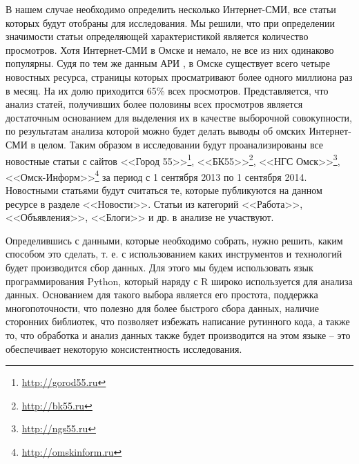 В нашем случае необходимо определить несколько Интернет-СМИ, все статьи которых будут отобраны для исследования. Мы решили, что при определении значимости статьи определяющей характеристикой является количество просмотров. Хотя Интернет-СМИ в Омске и немало, не все из них одинаково популярны. Судя по тем же данным АРИ \cite{ari_rating}, в Омске существует всего четыре новостных ресурса, страницы которых просматривают более одного миллиона раз в месяц. На их долю приходится 65\% всех просмотров. Представляется, что анализ статей, получивших более половины всех просмотров является достаточным основанием для выделения их в качестве выборочной совокупности, по результатам анализа которой можно будет делать выводы об омских Интернет-СМИ в целом. Таким образом в исследовании будут проанализированы все новостные статьи с сайтов <<Город 55>>\footnote{\href{http://gorod55.ru}{http://gorod55.ru}}, <<БК55>>\footnote{\href{http://bk55.ru}{http://bk55.ru}}, <<НГС Омск>>\footnote{\href{http://ngs55.ru}{http://ngs55.ru}}, <<Омск-Информ>>\footnote{\href{http://omskinform.ru}{http://omskinform.ru}} за период с 1 сентября 2013 по 1 сентября 2014. Новостными статьями будут считаться те, которые публикуются на данном ресурсе в разделе <<Новости>>. Статьи из категорий <<Работа>>, <<Объявления>>, <<Блоги>> и др. в анализе не участвуют.

Определившись с данными, которые необходимо собрать, нужно решить, каким способом это сделать, т. е. с использованием каких инструментов и технологий будет производится сбор данных. Для этого мы будем использовать язык программирования Python, который наряду с R широко используется для анализа данных. Основанием для такого выбора является его простота, поддержка многопоточности, что полезно для более быстрого сбора данных, наличие сторонних библиотек, что позволяет избежать написание рутинного кода, а также то, что обработка и анализ данных также будет производится на этом языке -- это обеспечивает некоторую консистентность исследования. %


